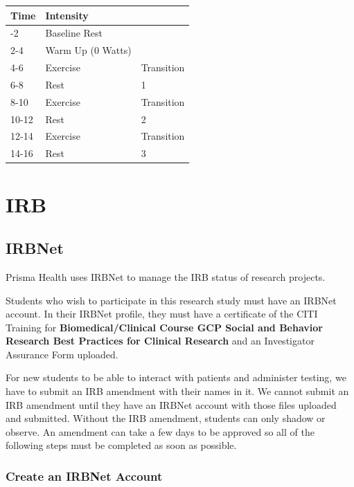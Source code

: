 \documentclass[
]{book}
\begin{document}
\begin{longtable}[]{@{}lll@{}}
\toprule\noalign{}
Time & Intensity & \\
\midrule\noalign{}
\endhead
\bottomrule\noalign{}
\endlastfoot
0-2 & Baseline Rest & \\
2-4 & Warm Up (0 Watts) & \\
4-6 & Exercise & Transition \\
6-8 & Rest & 1 \\
8-10 & Exercise & Transition \\
10-12 & Rest & 2 \\
12-14 & Exercise & Transition \\
14-16 & Rest & 3 \\
\end{longtable}

\hypertarget{IRB}{%
\chapter{IRB}\label{IRB}}

\hypertarget{IRBNet}{%
\section{IRBNet}\label{IRBNet}}

Prisma Health uses IRBNet to manage the IRB status of research projects.

Students who wish to participate in this research study must have an IRBNet account. In their IRBNet profile, they must have a certificate of the CITI Training for \textbf{Biomedical/Clinical Course GCP Social and Behavior Research Best Practices for Clinical Research} and an Investigator Assurance Form uploaded.

For new students to be able to interact with patients and administer testing, we have to submit an IRB amendment with their names in it. We cannot submit an IRB amendment until they have an IRBNet account with those files uploaded and submitted. Without the IRB amendment, students can only shadow or observe. An amendment can take a few days to be approved so all of the following steps must be completed as soon as possible.

\hypertarget{CreateIRBNetAccount}{%
\subsection{Create an IRBNet Account}\label{CreateIRBNetAccount}}
\end{document}
